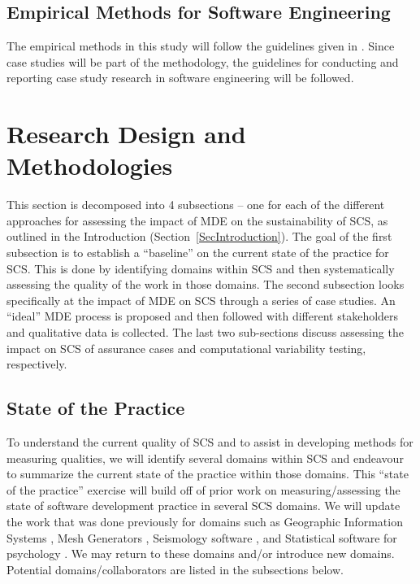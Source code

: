\documentclass[12pt]{article}
\begin{document}
\subsection{Empirical Methods for Software Engineering} \label{SecEmpirical}

The empirical methods in this study will follow the guidelines given in
\citet{KitchenhamEtAl2002}.  Since case studies will be part of the methodology,
the guidelines for conducting and reporting case study research in software
engineering \citep{RunesonAndHost2009} will be followed.

\section{Research Design and Methodologies} \label{SecMethodologies}

This section is decomposed into 4 subsections -- one for each of the different
approaches for assessing the impact of MDE on the sustainability of SCS, as
outlined in the Introduction (Section~\ref{SecIntroduction}).  The goal of the
first subsection is to establish a ``baseline'' on the current state of the
practice for SCS.  This is done by identifying domains within SCS and then
systematically assessing the quality of the work in those domains.  The second
subsection looks specifically at the impact of MDE on SCS through a series of
case studies.  An ``ideal'' MDE process is proposed and then followed with
different stakeholders and qualitative data is collected.  The last two
sub-sections discuss assessing the impact on SCS of assurance cases and
computational variability testing, respectively.

\subsection{State of the Practice} \label{SecStateOfThePractice}

To understand the current quality of SCS and to assist in developing methods for
measuring qualities, we will identify several domains within SCS and endeavour
to summarize the current state of the practice within those domains.  This
``state of the practice'' exercise will build off of prior work on
measuring/assessing the state of software development practice in several SCS
domains.  We will update the work that was done previously for domains such as
Geographic Information Systems \citep{SmithEtAl2018_arXivGIS}, Mesh Generators
\citep{SmithEtAl2016}, Seismology software \citep{SmithEtAl2018}, and
Statistical software for psychology \citep{SmithEtAl2018_StatSoft}.  We may
return to these domains and/or introduce new domains.  Potential
domains/collaborators are listed in the subsections below.
\end{document}
